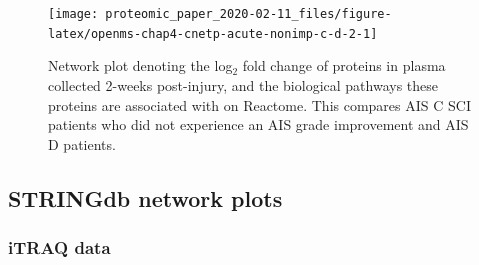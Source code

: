 \documentclass[9pt,lineno]{elife}
\begin{document}
\begin{landscape}



\begin{figure}

{\centering \texttt{[image: proteomic\_paper\_2020-02-11\_files/figure-latex/openms-chap4-cnetp-acute-nonimp-c-d-2-1]} 

}

\caption[Network plot - label-free - Acute C Non-Improvers VS Acute D]{Network plot denoting the log\(_2\) fold change of proteins in plasma collected 2-weeks post-injury, and the biological pathways these proteins are associated with on Reactome. This compares AIS C SCI patients who did not experience an AIS grade improvement and AIS D patients.}\label{fig:openms-chap4-cnetp-acute-nonimp-c-d-2}
\end{figure}

\end{landscape}

\hypertarget{sup-string-plots}{%
\subsection{STRINGdb network plots}\label{sup-string-plots}}

\hypertarget{itraq-data-2}{%
\subsubsection{iTRAQ data}\label{itraq-data-2}}
\end{document}
